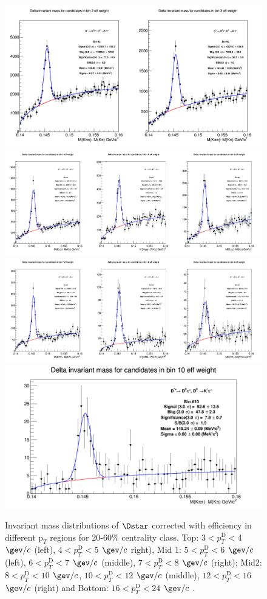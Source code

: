 \begin{figure}[!htp]
\centering
{\includegraphics[width=0.7\linewidth]{figuresVsCent/Dstar/MassPlots/2060/InvMassDistributions_Dstar_Bins2to3.png}}
{\includegraphics[width=0.9\linewidth]{figuresVsCent/Dstar/MassPlots/2060/InvMassDistributions_Dstar_Bins4to6.png}}
{\includegraphics[width=0.9\linewidth]{figuresVsCent/Dstar/MassPlots/2060/InvMassDistributions_Dstar_Bins7to9.png}}
{\includegraphics[width=0.6\linewidth]{figuresVsCent/Dstar/MassPlots/2060/InvMassDistributions_Dstar_Bins10to10.png}}

\caption{Invariant mass distributions of $\Dstar$ corrected with efficiency in different $\text{p}_T$ regions for 20-60$\%$ centrality class. Top: $3< p_{T}^{\text{D}}< 4$ $\gev/c$ (left), $4< p_{T}^{\text{D}}< 5$ $\gev/c$ right), Mid 1: $5< p_{T}^{\text{D}}< 6$ $\gev/c$ (left), $6 < p_{T}^{\text{D}} < 7$ $\gev/c$ (middle), $7< p_{T}^{\text{D}}< 8$ $\gev/c$ (right); Mid2: $8< p_{T}^{\text{D}}< 10$ $\gev/c$, $10< p_{T}^{\text{D}}< 12$ $\gev/c$  (middle), $12 < p_{T}^{\text{D}}< 16$ $\gev/c$  (right) and Bottom: $16<p_{T}^{\text{D}}< 24$ $\gev/c$ .}
\label{fig:InvMassDs2060}
\end{figure}

